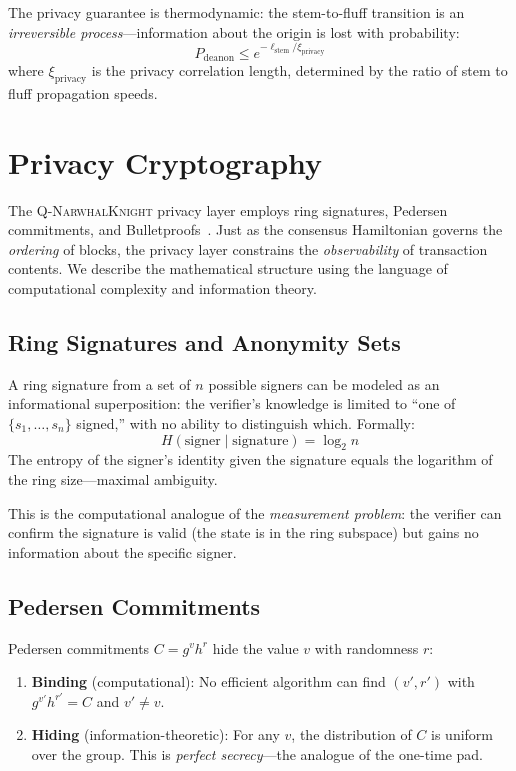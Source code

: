 \documentclass[12pt,a4paper,twocolumn]{article}
\newcommand{\qnk}{\textsc{Q-NarwhalKnight}}
\begin{document}
The privacy guarantee is thermodynamic: the stem-to-fluff transition is an \emph{irreversible process}---information about the origin is lost with probability:
\begin{equation}
P_{\mathrm{deanon}} \leq e^{-\ell_{\mathrm{stem}}/\xi_{\mathrm{privacy}}}
\end{equation}
where $\xi_{\mathrm{privacy}}$ is the privacy correlation length, determined by the ratio of stem to fluff propagation speeds.

\section{Privacy Cryptography}
\label{sec:mixing}

The \qnk{} privacy layer employs ring signatures, Pedersen commitments, and Bulletproofs~\cite{bulletproofs}. Just as the consensus Hamiltonian governs the \emph{ordering} of blocks, the privacy layer constrains the \emph{observability} of transaction contents. We describe the mathematical structure using the language of computational complexity and information theory.

\subsection{Ring Signatures and Anonymity Sets}

A ring signature from a set of $n$ possible signers can be modeled as an informational superposition: the verifier's knowledge is limited to ``one of $\{s_1, \ldots, s_n\}$ signed,'' with no ability to distinguish which. Formally:
\begin{equation}
H(\text{signer} \mid \text{signature}) = \log_2 n
\end{equation}
The entropy of the signer's identity given the signature equals the logarithm of the ring size---maximal ambiguity.

This is the computational analogue of the \emph{measurement problem}: the verifier can confirm the signature is valid (the state is in the ring subspace) but gains no information about the specific signer.

\subsection{Pedersen Commitments}

Pedersen commitments $C = g^v h^r$ hide the value $v$ with randomness $r$:
\begin{enumerate}[leftmargin=*]
\item \textbf{Binding} (computational): No efficient algorithm can find $(v', r')$ with $g^{v'} h^{r'} = C$ and $v' \neq v$.
\item \textbf{Hiding} (information-theoretic): For any $v$, the distribution of $C$ is uniform over the group. This is \emph{perfect secrecy}---the analogue of the one-time pad.
\end{enumerate}
\end{document}
